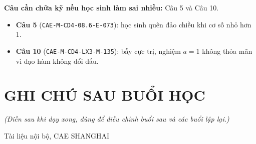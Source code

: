 \documentclass[11pt, a4paper]{article}
\begin{document}

\textbf{Câu cần chữa kỹ nếu học sinh làm sai nhiều:} Câu 5 và Câu 10.

\begin{itemize}[leftmargin=1.4em, itemsep=2pt]
\item \textbf{Câu 5} (\texttt{CAE-M-CD4-08.6-E-073}): học sinh quên đảo chiều khi cơ số nhỏ hơn $1$.
\item \textbf{Câu 10} (\texttt{CAE-M-CD4-LX3-M-135}): bẫy cực trị, nghiệm $a = 1$ không thỏa mãn vì đạo hàm không đổi dấu.
\end{itemize}

\section{GHI CHÚ SAU BUỔI HỌC}

\emph{(Điền sau khi dạy xong, dùng để điều chỉnh buổi sau và các buổi lặp lại.)}

\vspace{0.8cm}
\begin{center}
{\footnotesize\color{cae_blue} Tài liệu nội bộ, CAE SHANGHAI}
\end{center}
\end{document}
